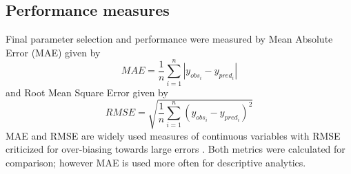 \subsection{Performance measures}
Final parameter selection and performance were measured by Mean Absolute Error (MAE) given by 
%
\begin{equation}
\label{eq:MAE}
MAE = \frac{1}{n}\sum^{n}_{i=1} \left | y_{obs_{i}}- y_{pred_{i}} \right |
\end{equation}
%
and Root Mean Square Error given by
%
\begin{equation}
\label{eq:RMSE}
RMSE = \sqrt{\frac{1}{n}\sum^{n}_{i=1} \left ( y_{obs_{i}}- y_{pred_{i}} \right )^{2}}
\end{equation}
MAE and RMSE are widely used measures of continuous variables with RMSE criticized for over-biasing towards large errors \cite{Chai2014Willmott2005}. Both metrics were calculated for comparison; however MAE is used more often for descriptive analytics.

